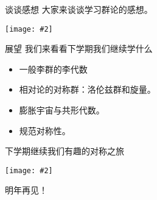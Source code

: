 \documentclass[aspectratio=1610,14pt,mathserif]{beamer}
\newcommand{\cpic}[2]{
\begin{center}
\texttt{[image: \#2]}
\end{center}
}
\begin{document}
\begin{frame}{谈谈感想}
大家来谈谈学习群论的感想。
\cpic{0.4}{good}
\end{frame}

\begin{frame}{展望}
我们来看看下学期我们继续学什么
\begin{itemize}
\item
一般李群的李代数
\item
相对论的对称群：洛伦兹群和旋量。
\item
膨胀宇宙与共形代数。
\item
规范对称性。
\end{itemize}
\end{frame}


\begin{frame}{下学期继续我们有趣的对称之旅}
\cpic{0.35}{az}
明年再见！
\end{frame}
\end{document}
